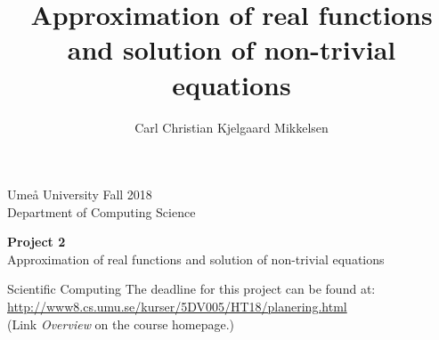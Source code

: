 \documentclass[a4paper,12pt]{article}
\title{Approximation of real functions and solution of non-trivial equations}
\author{Carl Christian Kjelgaard Mikkelsen}
\begin{document}
 

\thispagestyle{empty}

\noindent
Ume\aa{} University \hfill Fall 2018 \\
Department of Computing Science\\

\vskip 2.5cm

\begin{center} {\Huge {\bf Project 2}}\\{\Large Approximation of real functions and solution of non-trivial equations}\end{center} \vskip 0.3cm
\begin{center}
  {\huge Scientific Computing}
  \vfill
  {\Large The deadline for this project can be found at: \href{http://www8.cs.umu.se/kurser/5DV005/HT18/planering.html}{http://www8.cs.umu.se/kurser/5DV005/HT18/planering.html}\\
  (Link \emph{Overview} on the course homepage.)}
\end{center}
  \vfill
\end{document}
